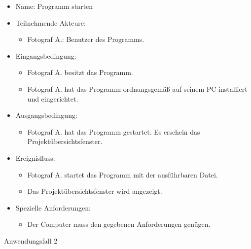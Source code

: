 \begin{itemize}
	\begin{itemize}
		\item Name: Programm starten
		\item Teilnehmende Akteure:
		\begin{itemize}
			\item	Fotograf A.: Benutzer des Programms.
		\end{itemize}
		\item Eingangsbedingung:
		\begin{itemize}
			\item Fotograf A. besitzt das Programm.
			\item Fotograf A. hat das Programm ordnungsgemäß auf seinem PC installiert und eingerichtet.						
		\end{itemize}
		\item Ausgangsbedingung:
		\begin{itemize}
			\item	Fotograf A. hat das Programm gestartet. Es erschein das Projektübersichtsfenster.		
		\end{itemize}
		\item Ereignisfluss:	
		\begin{itemize}
			\item Fotograf A. startet das Programm mit der ausführbaren Datei.		
			\item Das Projektübersichtsfenster wird angezeigt.
		\end{itemize}
		\item Spezielle Anforderungen:
		\begin{itemize}
			\item	Der Computer muss den gegebenen Anforderungen genügen.
		\end{itemize}
	\end{itemize}
	
	\begin{description}
	\item[Anwendungsfall 2]
	\end{description}
	

\end{itemize}
